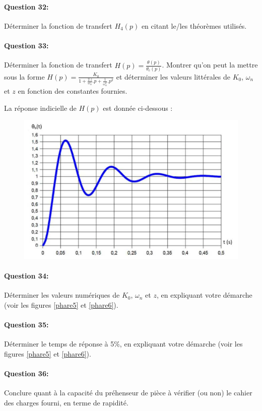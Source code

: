 \paragraph{Question 32:} Déterminer la fonction de transfert $H_4(p)$ en citant le/les théorèmes utilisés.

\paragraph{Question 33:} Déterminer la fonction de transfert $H(p)=\frac{\theta(p)}{\theta_c(p)}$. Montrer qu'on peut la mettre sous la forme $H(p)=\frac{K_0}{1+\frac{2.z}{\omega_n}.p+\frac{1}{\omega_n^2}.p^2}$ et déterminer les valeurs littérales de $K_0$, $\omega_n$ et $z$ en fonction des constantes fournies.

La réponse indicielle de $H(p)$ est donnée ci-dessous :
\begin{figure}[!h]
  \centering
  \includegraphics[width=0.6\linewidth]{img/robot4}
  \label{robot4}
\end{figure}

\paragraph{Question 34:} Déterminer les valeurs numériques de $K_0$, $\omega_n$ et $z$, en expliquant votre démarche (voir les figures \ref{phare5} et \ref{phare6}).

\paragraph{Question 35:} Déterminer le temps de réponse à 5\%, en expliquant votre démarche (voir les figures \ref{phare5} et \ref{phare6}).

\paragraph{Question 36:} Conclure quant à la capacité du préhenseur de pièce à vérifier (ou non) le cahier des charges fourni, en terme de rapidité.

